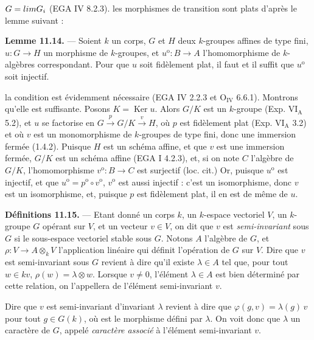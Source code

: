 \documentclass[11pt,a4paper]{article}
\begin{document}
$G = \varprojlim G_{i}$ (EGA IV 8.2.3). \struck{\ill{}} les morphismes de
transition sont  plats d'après le lemme suivant :

\textbf{Lemme 11.14.} — Soient $k$ un corps, $G$ et $H$ deux $k$-groupes
affines de type fini, $u : G \to H$ un morphisme de $k$-groupes, et
$u^{\mathrm{o}} : B \to A$ l'homomorphisme de $k$-algèbres correspondant.
Pour que $u$ soit fidèlement plat, il faut et il suffit que
$u^{\mathrm{o}}$ soit injectif.

la condition est évidemment nécessaire (EGA IV 2.2.3 et
$\mathrm{O}_{\mathrm{IV}}$ 6.6.1). Montrons qu'elle est suffisante. Posons
$K = \operatorname{Ker} u$. Alors $G/K$ est un $k$-groupe  (Exp. $\mathrm{VI}_{\mathrm{A}}$ 5.2), et $u$ se factorise en
$G \xrightarrow{\ p\ } G/K \xrightarrow{\ v\ } H$, où $p$ est fidèlement
plat (Exp. $\mathrm{VI}_{\mathrm{A}}$ 3.2) et où $v$ est un monomorphisme
de $k$-groupes de type fini, donc une immersion fermée (1.4.2). Puisque $H$
est un schéma affine, et que $v$ est une immersion fermée, $G/K$ est un
schéma affine (EGA I 4.2.3), et, si on note $C$ l'algèbre de $G/K$,
l'homomorphisme $v^{\mathrm{o}} : B \to C$ est surjectif (loc. cit.) Or,
puisque $u^{\mathrm{o}}$ est injectif, et que
$u^{\mathrm{o}} = p^{\mathrm{o}} \circ v^{\mathrm{o}}$, $v^{\mathrm{o}}$
est aussi injectif : c'est un isomorphisme, donc $v$ est un isomorphisme,
et, puisque $p$ est fidèlement plat, il en est de même de $u$.

\textbf{Définitions 11.15.} — Etant donné un corps $k$, un $k$-espace
vectoriel $V$, un $k$-groupe $G$ opérant sur $V$, et un vecteur
$v \in V$, on dit que $v$ est \emph{semi-invariant} sous $G$ si le
sous-espace vectoriel   stable sous $G$. Notons $A$
l'algèbre de $G$, et $\rho : V \to A \otimes_{k} V$ l'application linéaire
qui définit l'opération de $G$ sur $V$. Dire que $v$ est semi-invariant
sous $G$ revient à dire \struck{\ill{}} qu'il existe $\lambda \in A$ tel
que, pour tout $w \in kv$, $\rho(w) = \lambda \otimes w$. Lorsque
$v \neq 0$, l'élément $\lambda \in A$ est bien déterminé par cette
relation, on l'appellera  de l'élément
semi-invariant $v$.

 Dire que $v$ est semi-invariant
\struck{\ill{}} d'invariant $\lambda$ revient à dire que
$\varphi(g, v) = \lambda(g)\, v$ pour tout $g \in G(k)$, où
\struck{\ill{}}  est le
morphisme défini par $\lambda$. On voit donc que $\lambda$
 un caractère \struck{$\chi$} de $G$, appelé
\emph{caractère associé} à l'élément semi-invariant $v$. 
\end{document}
